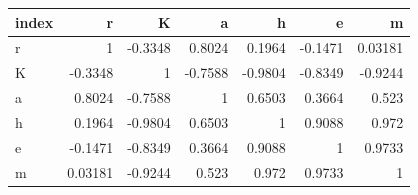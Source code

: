 \begin{tabular}{lrrrrrr}
\toprule
index & r & K & a & h & e & m \\
\midrule
r & 1 & -0.3348 & 0.8024 & 0.1964 & -0.1471 & 0.03181 \\
K & -0.3348 & 1 & -0.7588 & -0.9804 & -0.8349 & -0.9244 \\
a & 0.8024 & -0.7588 & 1 & 0.6503 & 0.3664 & 0.523 \\
h & 0.1964 & -0.9804 & 0.6503 & 1 & 0.9088 & 0.972 \\
e & -0.1471 & -0.8349 & 0.3664 & 0.9088 & 1 & 0.9733 \\
m & 0.03181 & -0.9244 & 0.523 & 0.972 & 0.9733 & 1 \\
\bottomrule
\end{tabular}
